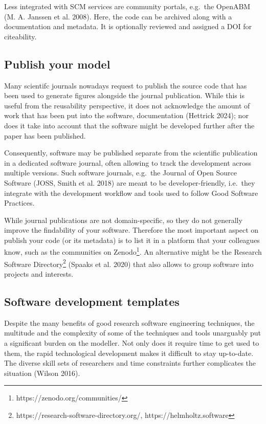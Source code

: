 \documentclass[preprint,11pt,5p]{elsarticle}
\begin{document}
Less integrated with SCM services are community portals, e.g.~the
OpenABM (M. A. Janssen et al. 2008). Here, the code can be archived
along with a documentation and metadata. It is optionally reviewed and
assigned a DOI for citeability.

\subsection{Publish your model}\label{publish-your-model}

Many scientifc journals nowadays request to publish the source code that
has been used to generate figures alongside the journal publication.
While this is useful from the reusability perspective, it does not
acknowledge the amount of work that has been put into the software,
documentation (Hettrick 2024); nor does it take into account that the
software might be developed further after the paper has been published.

Consequently, software may be published separate from the scientific
publication in a dedicated software journal, often allowing to track the
development across multiple versions. Such software journals, e.g.~the
Journal of Open Source Software (JOSS, Smith et al. 2018) are meant to
be developer-friendly, i.e.~they integrate with the development workflow
and tools used to follow Good Software Practices.

While journal publications are not domain-specific, so they do not
generally improve the findability of your software. Therefore the most
important aspect on publish your code (or its metadata) is to list it in
a platform that your colleagues know, such as the communities on
Zenodo\footnote{https://zenodo.org/communities/}. An alternative might
be the Research Software Directory\footnote{https://research-software-directory.org/,
  https://helmholtz.software} (Spaaks et al. 2020) that also allows to
group software into projects and interests.

\subsection{Software development
templates}\label{software-development-templates}

Despite the many benefits of good research software engineering
techniques, the multitude and the complexity of some of the techniques
and tools unarguably put a significant burden on the modeller. Not only
does it require time to get used to them, the rapid technological
development makes it difficult to stay up-to-date. The diverse skill
sets of researchers and time constraints further complicates the
situation (Wilson 2016).
\end{document}
